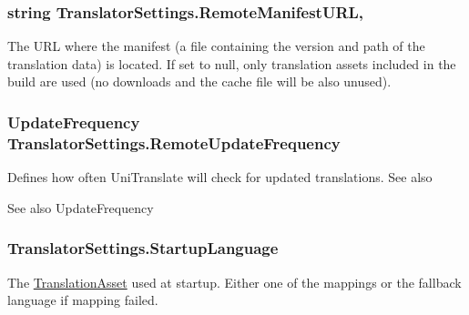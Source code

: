 \subsubsection[{\texorpdfstring{Remote\+Manifest\+U\+RL}{RemoteManifestURL}}]{\setlength{\rightskip}{0pt plus 5cm}string Translator\+Settings.\+Remote\+Manifest\+U\+RL\hspace{0.3cm}{\ttfamily [get]}, {\ttfamily [set]}}\hypertarget{class_translator_settings_aa5bc9368add517c7ba8b0daad0d6812c}{}\label{class_translator_settings_aa5bc9368add517c7ba8b0daad0d6812c}


The U\+RL where the manifest (a file containing the version and path of the translation data) is located. If set to null, only translation assets included in the build are used (no downloads and the cache file will be also unused). 

\subsubsection[{\texorpdfstring{Remote\+Update\+Frequency}{RemoteUpdateFrequency}}]{\setlength{\rightskip}{0pt plus 5cm}Update\+Frequency Translator\+Settings.\+Remote\+Update\+Frequency\hspace{0.3cm}{\ttfamily [get]}}\hypertarget{class_translator_settings_a7ec0ae9e38d63a03a8f327c7fca65298}{}\label{class_translator_settings_a7ec0ae9e38d63a03a8f327c7fca65298}


Defines how often Uni\+Translate will check for updated translations. See also \begin{DoxySeeAlso}{See also}
Update\+Frequency


\end{DoxySeeAlso}


\subsubsection[{\texorpdfstring{Startup\+Language}{StartupLanguage}}]{ Translator\+Settings.\+Startup\+Language\hspace{0.3cm}{\ttfamily [get]}}\hypertarget{class_translator_settings_afad650d280bcf715350fdd971c0a0140}{}\label{class_translator_settings_afad650d280bcf715350fdd971c0a0140}


The \hyperlink{class_translation_asset}{Translation\+Asset} used at startup. Either one of the mappings or the fallback language if mapping failed. 


